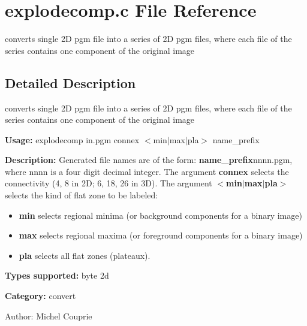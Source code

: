 \section{explodecomp.c File Reference}
\label{explodecomp_8c}
converts single 2D pgm file into a series of 2D pgm files, where each file of the series contains one component of the original image 



\subsection{Detailed Description}
converts single 2D pgm file into a series of 2D pgm files, where each file of the series contains one component of the original image 

{\bf Usage:} explodecomp in.pgm connex $<$min$|$max$|$pla$>$ name\_\-prefix

{\bf Description:} Generated file names are of the form: {\bf name\_\-prefix}nnnn.pgm, where nnnn is a four digit decimal integer. The argument {\bf connex} selects the connectivity (4, 8 in 2D; 6, 18, 26 in 3D). The argument {\bf $<$min$|$max$|$pla$>$} selects the kind of flat zone to be labeled: \begin{itemize}
\item {\bf min} selects regional minima (or background components for a binary image) \item {\bf max} selects regional maxima (or foreground components for a binary image) \item {\bf pla} selects all flat zones (plateaux).\end{itemize}
{\bf Types supported:} byte 2d

{\bf Category:} convert

\begin{Desc}
\item[Author:]Michel Couprie \end{Desc}

